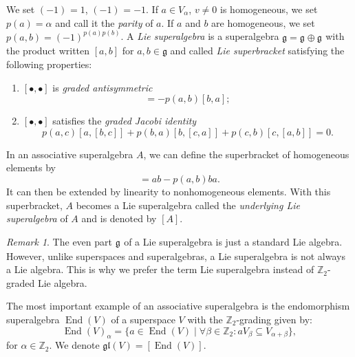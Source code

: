 \documentclass[a4paper, 12pt, reqno]{amsart}
\theoremstyle{remark}
\newtheorem{remark}[theorem]{Remark}
\numberwithin{equation}{subsection}
\DeclareMathOperator{\End}{End}
\DeclareMathOperator{\zero}{\overline{0}}
\DeclareMathOperator{\one}{\overline{1}}
\begin{document}
We set $(-1)^{\zero} = 1$, $(-1)^{\one} = -1$.
If $a\in V_\alpha$, $v\neq 0$ is homogeneous, we set $p(a) = \alpha$ and call it the \emph{parity} of $a$.
If $a$ and $b$ are homogeneous, we set $p(a, b) = (-1)^{p(a)p(b)}$.
A \emph{Lie superalgebra} is a superalgebra $\mathfrak{g} = \mathfrak{g}_{\zero} \oplus \mathfrak{g}_{\one}$ with the product written $[a, b]$ for $a, b \in \mathfrak{g}$ and called \emph{Lie superbracket} satisfying the following properties:
\begin{enumerate}
\item $[\bullet, \bullet]$ is \emph{graded antisymmetric}
  \begin{equation*}
    [a, b] = -p(a, b)[b, a];
  \end{equation*}
\item $[\bullet, \bullet]$ satisfies the \emph{graded Jacobi identity}
  \begin{equation*}
    p(a, c)[a, [b, c]] + p(b, a)[b, [c, a]] + p(c, b)[c, [a, b]] = 0.
  \end{equation*}
\end{enumerate}

In an associative superalgebra $A$, we can define the superbracket of homogeneous elements by
\begin{equation*}
  [a, b] = ab - p(a, b)ba.
\end{equation*}
It can then be extended by linearity to nonhomogeneous elements.
With this superbracket, $A$ becomes a Lie superalgebra called the \emph{underlying Lie superalgebra} of $A$ and is denoted by $[A]$.

\begin{remark}
  \label{rmk:1}
  The even part $\mathfrak{g}_{\zero}$ of a Lie superalgebra is just a standard Lie algebra.
  However, unlike superspaces and superalgebras, a Lie superalgebra is not always a Lie algebra.
  This is why we prefer the term Lie superalgebra instead of $\mathbb{Z}_2$-graded Lie algebra.
\end{remark}

The most important example of an associative superalgebra is the endomorphism superalgebra $\End(V)$ of a superspace $V$ with the $\mathbb{Z}_2$-grading given by:
\begin{equation*}
  \End(V)_{\alpha} = \{a \in \End(V) \mid \forall \beta \in \mathbb{Z}_2: aV_\beta \subseteq V_{\alpha + \beta}\},
\end{equation*}
for $\alpha \in \mathbb{Z}_2$.
We denote $\mathfrak{gl}(V) = [\End(V)]$.
\end{document}
